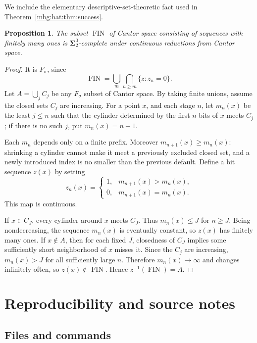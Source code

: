 \documentclass[11pt,letterpaper]{article}
\newtheorem{proposition}[theorem]{Proposition}
\theoremstyle{definition}
\newcommand{\FIN}{\operatorname{FIN}}
\begin{document}
We include the elementary descriptive-set-theoretic fact used in
Theorem~\ref{mbg:hat:thm:success}.

\begin{proposition}
The subset \(\FIN\) of Cantor space consisting of sequences with
finitely many ones is
\(\boldsymbol{\Sigma}^0_2\)-complete under continuous reductions
from Cantor space.
\end{proposition}
\begin{proof}
It is \(F_\sigma\), since
\[
  \FIN=\bigcup_m\bigcap_{n\ge m}\{z:z_n=0\}.
\]
Let \(A=\bigcup_j C_j\) be any \(F_\sigma\) subset of Cantor
space. By taking finite unions, assume the closed sets \(C_j\)
are increasing. For a point \(x\), and each stage \(n\), let
\(m_n(x)\) be the least \(j\le n\) such that the cylinder
determined by the first \(n\) bits of \(x\) meets \(C_j\);
if there is no such \(j\), put \(m_n(x)=n+1\).

Each \(m_n\) depends only on a finite prefix. Moreover
\(m_{n+1}(x)\ge m_n(x)\): shrinking a cylinder cannot make it
meet a previously excluded closed set, and a newly introduced
index is no smaller than the previous default.
Define a bit sequence \(z(x)\) by setting
\[
  z_n(x)=
  \begin{cases}
  1,&m_{n+1}(x)>m_n(x),\\
  0,&m_{n+1}(x)=m_n(x).
  \end{cases}
\]
This map is continuous.

If \(x\in C_J\), every cylinder around \(x\) meets \(C_J\).
Thus \(m_n(x)\le J\) for \(n\ge J\). Being nondecreasing,
the sequence \(m_n(x)\) is eventually constant, so \(z(x)\)
has finitely many ones.
If \(x\notin A\), then for each fixed \(J\), closedness of
\(C_J\) implies some sufficiently short neighborhood of \(x\)
misses it. Since the \(C_j\) are increasing,
\(m_n(x)>J\) for all sufficiently large \(n\).
Therefore \(m_n(x)\to\infty\) and changes infinitely often,
so \(z(x)\notin\FIN\). Hence \(z^{-1}(\FIN)=A\).
\end{proof}

\section{Reproducibility and source notes}
\label{mbg:hat:app:repro}

\subsection{Files and commands}
\end{document}
